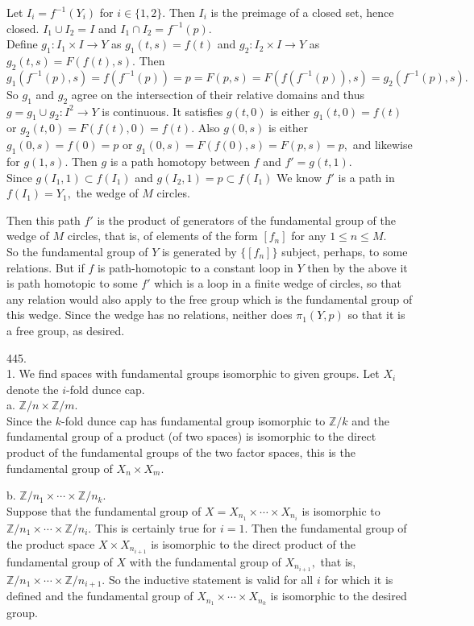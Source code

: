 \documentclass{article}
\begin{document}
Let $I_i=f^{-1}(Y_i)$ for $i\in\{1,2\}.$  Then $I_i$ is the preimage of a closed set, hence closed.  $I_1\cup I_2=I$ and $I_1\cap I_2=f^{-1}(p).$
\\
Define $g_1:I_1\times I\to Y$ as $g_1(t,s)=f(t)$ and $g_2:I_2\times I\to Y$ as $g_2(t,s)=F(f(t),s).$  Then $g_1(f^{-1}(p),s)=f(f^{-1}(p))=p=F(p,s)=F(f(f^{-1}(p)),s)=g_2(f^{-1}(p),s).$
\\
So $g_1$ and $g_2$ agree on the intersection of their relative domains and thus $g=g_1\cup g_2:I^2\to Y$ is continuous.  It satisfies $g(t,0)$ is either $g_1(t,0)=f(t)$ or $g_2(t,0)=F(f(t),0)=f(t).$  Also $g(0,s)$ is either $g_1(0,s)=f(0)=p$ or $g_1(0,s)=F(f(0),s)=F(p,s)=p,$ and likewise for $g(1,s).$  Then $g$ is a path homotopy between $f$ and $f'=g(t,1).$
\\
Since $g(I_1,1)\subset f(I_1)$ and $g(I_2,1)=p\subset f(I_1)$  We know $f'$ is a path in $f(I_1)=Y_1,$ the wedge of $M$ circles.

Then this path $f'$ is the product of generators of the fundamental group of the wedge of $M$ circles, that is, of elements of the form $[f_n]$ for any $1\le n\le M.$
\\
So the fundamental group of $Y$ is generated by $\{[f_n]\}$ subject, perhaps, to some relations.  But if $f$ is path-homotopic to a constant loop in $Y$ then by the above it is path homotopic to some $f'$ which is a loop in a finite wedge of circles, so that any relation would also apply to the free group which is the fundamental group of this wedge.  Since the wedge has no relations, neither does $\pi_1(Y,p)$ so that it is a free group, as desired.

445.
\\1. We find spaces with fundamental groups isomorphic to given groups.  Let $X_i$ denote the $i$-fold dunce cap.
\\a. $\mathbb{Z}/n\times \mathbb{Z}/m.$
\\Since the $k$-fold dunce cap has fundamental group isomorphic to $\mathbb{Z}/k$ and the fundamental group of a product (of two spaces) is isomorphic to the direct product of the fundamental groups of the two factor spaces, this is the fundamental group of $X_n\times X_m.$

b. $\mathbb{Z}/n_1\times\cdots\times \mathbb{Z}/n_k.$
\\Suppose that the fundamental group of $X=X_{n_1}\times \cdots\times X_{n_i}$ is isomorphic to $\mathbb{Z}/n_1\times\cdots\times \mathbb{Z}/n_i.$  This is certainly true for $i=1.$  Then the fundamental group of the product space $X\times X_{n_{i+1}}$ is isomorphic to the direct product of the fundamental group of $X$ with the fundamental group of $X_{n_{i+1}},$ that is, $\mathbb{Z}/n_1\times\cdots\times \mathbb{Z}/n_{i+1}.$  So the inductive statement is valid for all $i$ for which it is defined and the fundamental group of $X_{n_1}\times\cdots\times X_{n_k}$ is isomorphic to the desired group.
\end{document}
